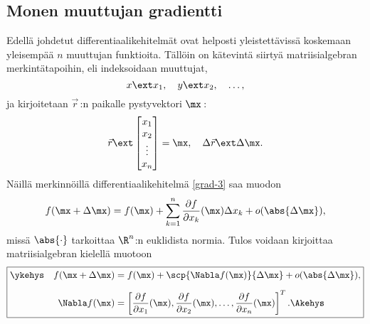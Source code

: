 \subsection{Monen muuttujan gradientti}

Edellä johdetut differentiaalikehitelmät ovat helposti yleistettävissä koskemaan yleisempää
$n$ muuttujan funktioita. Tällöin on kätevintä siirtyä matriisialgebran merkintätapoihin, eli
indeksoidaan muuttujat,
\[
x \ext x_1,\quad y \ext x_2,\quad \ldots,
\]
ja kirjoitetaan $\vec r\,$:n paikalle pystyvektori $\mx\,$:
\[
\vec r \ext \begin{bmatrix} x_1 \\ x_2 \\ \vdots \\ x_n \end{bmatrix}=\mx,\quad 
\Delta\vec r \ext \Delta\mx.
\]
Näillä merkinnöillä differentiaalikehitelmä \eqref{grad-3} saa muodon
\[
f(\mx+\Delta\mx)
     =f(\mx)+\sum_{k=1}^n \frac{\partial f}{\partial x_k}(\mx)\Delta x_k+o(\abs{\Delta\mx}),
\]
missä $\abs{\cdot}$ tarkoittaa $\R^n$:n euklidista normia. Tulos voidaan kirjoittaa 
matriisialgebran kielellä muotoon
\begin{equation} \label{grad-4}
\boxed{\begin{aligned}
\ykehys\quad f(\mx+\Delta\mx)&=f(\mx)+\scp{\Nabla f(\mx)}{\Delta\mx}
                              +o(\abs{\Delta\mx}), \\[2mm]
             \Nabla f(\mx)   &=\left[\frac{\partial f}{\partial x_1}(\mx),
                                     \frac{\partial f}{\partial x_2}(\mx),\ldots,
                                     \frac{\partial f}{\partial x_n}(\mx)\right]^T.\Akehys\quad
       \end{aligned} }
\end{equation}

